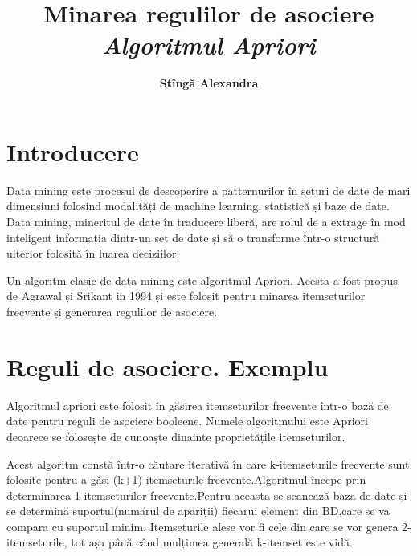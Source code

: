 \documentclass[11pt]{diazessay} %
\title{\textbf{Minarea regulilor de asociere} \\ 
{\Large\itshape  Algoritmul Apriori}} %
\author{\textbf{Stîngă Alexandra}}
\begin{document}
\maketitle %



\section*{Introducere}

Data mining este procesul de descoperire a patternurilor în seturi de date de mari dimensiuni folosind modalități de machine learning, statistică și baze de date. Data mining, mineritul de date în traducere liberă, are rolul de a extrage în mod inteligent informația dintr-un set de date și să o transforme într-o structură ulterior folosită în luarea deciziilor.

Un algoritm clasic de data mining este algoritmul Apriori. Acesta a fost propus de Agrawal și Srikant in 1994 și este folosit pentru minarea itemseturilor frecvente și generarea regulilor de asociere.

\section*{Reguli de asociere. Exemplu}

Algoritmul apriori este folosit în găsirea itemseturilor frecvente într-o bază de date pentru reguli de asociere booleene. Numele algoritmului este Apriori deoarece se folosește de cunoaște dinainte proprietățile itemseturilor.

Acest algoritm constă într-o căutare iterativă în care k-itemseturile frecvente sunt folosite pentru a găsi (k+1)-itemseturile frecvente.Algoritmul începe prin determinarea 1-itemseturilor frecvente.Pentru aceasta se scanează baza de date și se determină suportul(numărul de apariții) fiecarui element din BD,care se va compara cu suportul minim. Itemseturile alese vor fi cele din care se vor genera 2-itemseturile, tot așa până când mulțimea generală k-itemset este vidă.
\end{document}
